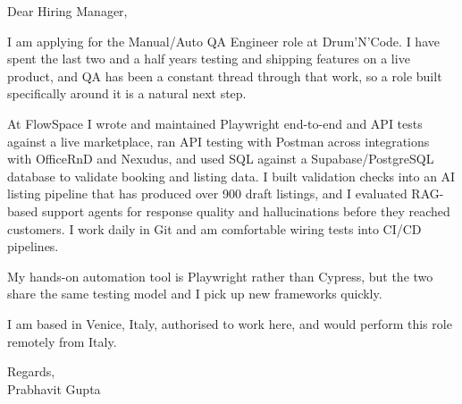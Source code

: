 \documentclass[a4paper,11pt]{article}
\begin{document}
Dear Hiring Manager,

I am applying for the Manual/Auto QA Engineer role at Drum'N'Code. I have spent the last two and a half years testing and shipping features on a live product, and QA has been a constant thread through that work, so a role built specifically around it is a natural next step.

At FlowSpace I wrote and maintained Playwright end-to-end and API tests against a live marketplace, ran API testing with Postman across integrations with OfficeRnD and Nexudus, and used SQL against a Supabase/PostgreSQL database to validate booking and listing data. I built validation checks into an AI listing pipeline that has produced over 900 draft listings, and I evaluated RAG-based support agents for response quality and hallucinations before they reached customers. I work daily in Git and am comfortable wiring tests into CI/CD pipelines.

My hands-on automation tool is Playwright rather than Cypress, but the two share the same testing model and I pick up new frameworks quickly.

I am based in Venice, Italy, authorised to work here, and would perform this role remotely from Italy.

Regards,\\
Prabhavit Gupta
\end{document}
